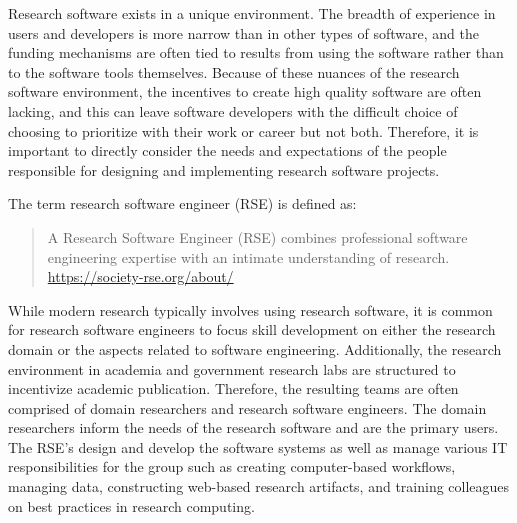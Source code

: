 \documentclass[]{nrel}
\begin{document}




\begin{appendices} %
    

    \label{app:A}
Research software exists in a unique environment.
The breadth of experience in users and developers is more narrow than in other types of software,
and the funding mechanisms are often tied to results from using the software rather than
to the software tools themselves.
Because of these nuances of the research software environment, the incentives to create high
quality software are often lacking, and this can leave software developers with the difficult
choice of choosing to prioritize with their work or career but not both.
Therefore, it is important to directly consider the needs and expectations of the people
responsible for designing and implementing research software projects.

The term research software engineer (RSE) is defined as:
\begin{quote}

A Research Software Engineer (RSE) combines professional software engineering expertise with
an intimate understanding of research.
\url{https://society-rse.org/about/}
\end{quote}

While modern research typically involves using research software, it is common for research
software engineers to focus skill development on either the research domain or the aspects
related to software engineering.
Additionally, the research environment in academia and government research labs are structured
to incentivize academic publication.
Therefore, the resulting teams are often comprised of domain researchers and research software
engineers.
The domain researchers inform the needs of the research software and are the primary users.
The RSE’s design and develop the software systems as well as manage various IT responsibilities
for the group such as creating computer-based workflows, managing data, constructing web-based
research artifacts, and training colleagues on best practices in research computing.


\end{appendices}
\end{document}
